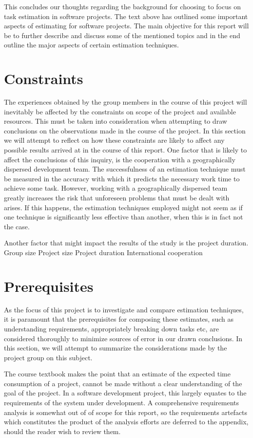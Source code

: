 This concludes our thoughts regarding the background for choosing to focus on task estimation in software projects. The text above has outlined some important aspects of estimating for software projects. The main objective for this report will be to further describe and discuss some of the mentioned topics and in the end outline the major aspects of certain estimation techniques.

\section{Constraints}
The experiences obtained by the group members in the course of this project will inevitably be affected by the constraints on scope of the project and available resources. This must be taken into consideration when attempting to draw conclusions on the observations made in the course of the project. In this section we will attempt to reflect on how these constraints are likely to affect any possible results arrived at in the course of this report.
One factor that is likely to affect the conclusions of this inquiry, is the cooperation with a geographically dispersed development team. The successfulness of an estimation technique must be measured in the accuracy with which it predicts the necessary work time to achieve some task. However, working with a geographically dispersed team greatly increases the risk that unforeseen problems that must be dealt with arises. If this happens, the estimation techniques employed might not seem as if one technique is significantly less effective than another, when this is in fact not the case.

Another factor that might impact the results of the study is the project duration.  
Group size
Project size
Project duration
International cooperation
\section{Prerequisites}
As the focus of this project is to investigate and compare estimation techniques, it is paramount that the prerequisites for composing these estimates, such as understanding requirements, appropriately breaking down tasks etc, are considered thoroughly to minimize sources of error in our drawn conclusions. In this section, we will attempt to summarize the considerations made by the project group on this subject.

The course textbook makes the point that an estimate of the expected time consumption of a project, cannot be made without a clear understanding of the goal of the project. In a software development project, this largely equates to the requirements of the system under development. A comprehensive requirements analysis is somewhat out of of scope for this report, so the requirements artefacts which constitutes the product of the analysis efforts are deferred to the appendix, should the reader wish to review them.

